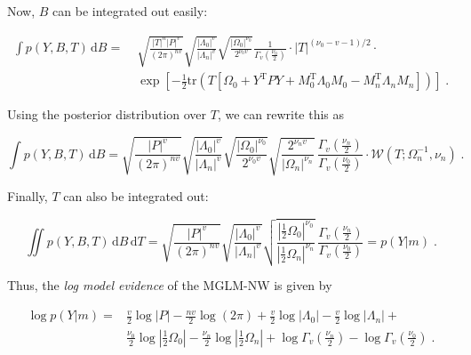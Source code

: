 Now, $B$ can be integrated out easily:

\vspace{-0.5em}
\begin{equation} \label{eq:MGLM-NW-LME3}
\begin{split}
\int p(Y,B,T) \, \mathrm{d}B = \; & \sqrt{\frac{|T|^n |P|^v}{(2 \pi)^{nv}}} \sqrt{\frac{|\Lambda_0|^v}{|\Lambda_n|^v}} \sqrt{\frac{|\Omega_0|^{\nu_0}}{2^{\nu_0 v}}} \frac{1}{\Gamma_v \left( \frac{\nu_0}{2} \right)} \cdot |T|^{(\nu_0-v-1)/2} \cdot \\
& \exp\left[ -\frac{1}{2} \mathrm{tr}\left( T \left[ \Omega_0 + Y^\mathrm{T} P Y + M_0^\mathrm{T} \Lambda_0 M_0 - M_n^\mathrm{T} \Lambda_n M_n \right] \right) \right] \; .
\end{split}
\end{equation}

Using the posterior distribution over $T$, we can rewrite this as

\begin{equation} \label{eq:MGLM-NW-LME4}
\int p(Y,B,T) \, \mathrm{d}B = \sqrt{\frac{|P|^v}{(2 \pi)^{nv}}} \sqrt{\frac{|\Lambda_0|^v}{|\Lambda_n|^v}} \sqrt{\frac{|\Omega_0|^{\nu_0}}{2^{\nu_0 v}}} \sqrt{\frac{2^{\nu_n v}}{|\Omega_n|^{\nu_n}}} \, \frac{\Gamma_v \left( \frac{\nu_n}{2} \right)}{\Gamma_v \left( \frac{\nu_0}{2} \right)} \cdot \mathcal{W}(T; \Omega_n^{-1}, \nu_n) \; .
\end{equation}

Finally, $T$ can also be integrated out:

\begin{equation} \label{eq:MGLM-NW-LME5}
\iint p(Y,B,T) \, \mathrm{d}B \, \mathrm{d}T = \sqrt{\frac{|P|^v}{(2 \pi)^{nv}}} \sqrt{\frac{|\Lambda_0|^v}{|\Lambda_n|^v}} \sqrt{\frac{\left| \frac{1}{2} \Omega_0 \right|^{\nu_0}}{\left| \frac{1}{2} \Omega_n \right|^{\nu_n}}} \, \frac{\Gamma_v \left( \frac{\nu_n}{2} \right)}{\Gamma_v \left( \frac{\nu_0}{2} \right)} = p(Y|m) \; .
\end{equation}

Thus, the \textit{log model evidence} of the MGLM-NW is given by

\vspace{-0.5em}
\begin{equation} \label{eq:MGLM-NW-LME6}
\begin{split}
\log p(Y|m) = & \frac{v}{2} \log |P| - \frac{nv}{2} \log (2 \pi)  + \frac{v}{2} \log |\Lambda_0| - \frac{v}{2} \log |\Lambda_n| + \\
& \frac{\nu_0}{2} \log\left| \frac{1}{2} \Omega_0 \right| - \frac{\nu_n}{2} \log\left| \frac{1}{2} \Omega_n \right| + \log \Gamma_v \left( \frac{\nu_n}{2} \right) - \log \Gamma_v \left( \frac{\nu_0}{2} \right) \; .
\end{split}
\end{equation}


